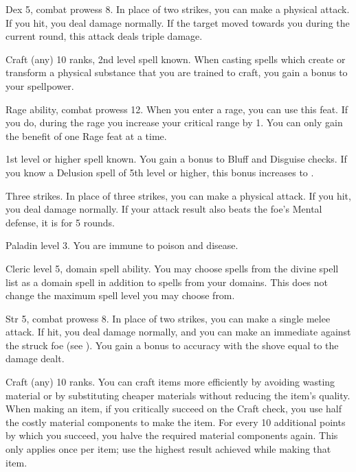 \featpres Dex 5, combat prowess 8.
\featben In place of two strikes, you can make a physical attack.
If you hit, you deal damage normally.
If the target moved towards you during the current round, this attack deals triple damage.


\featpres Craft (any) 10 ranks, 2nd level spell known.
\featben When casting spells which create or transform a physical substance that you are trained to craft, you gain a  bonus to your spellpower.


\featpres Rage ability, combat prowess 12.
\featben When you enter a rage, you can use this feat. If you do, during the rage you increase your critical range by 1.
 You can only gain the benefit of one Rage feat at a time.

\featpre 1st level or higher  spell known.
\featben You gain a  bonus to Bluff and Disguise checks.
If you know a Delusion spell of 5th level or higher, this bonus increases to .

\featpre Three strikes.
\featben In place of three strikes, you can make a physical attack.
If you hit, you deal damage normally.
If your attack result also beats the foe's Mental defense, it is \disoriented for 5 rounds.

\featpre Paladin level 3.
\featben You are immune to poison and disease.


\featpres Cleric level 5, domain spell ability.
\featben You may choose spells from the divine spell list as a domain spell in addition to spells from your domains.
This does not change the maximum spell level you may choose from.

\featpres Str 5, combat prowess 8.
\featben In place of two strikes, you can make a single melee attack.
If hit, you deal damage normally, and you can make an immediate  against the struck foe (see ).
You gain a bonus to accuracy with the shove equal to the damage dealt.

\featpre Craft (any) 10 ranks.
\featben You can craft items more efficiently by avoiding wasting material or by substituting cheaper materials without reducing the item's quality.
When making an item, if you critically succeed on the Craft check, you use half the costly material components to make the item.
For every 10 additional points by which you succeed, you halve the required material components again.
This only applies once per item; use the highest result achieved while making that item.

